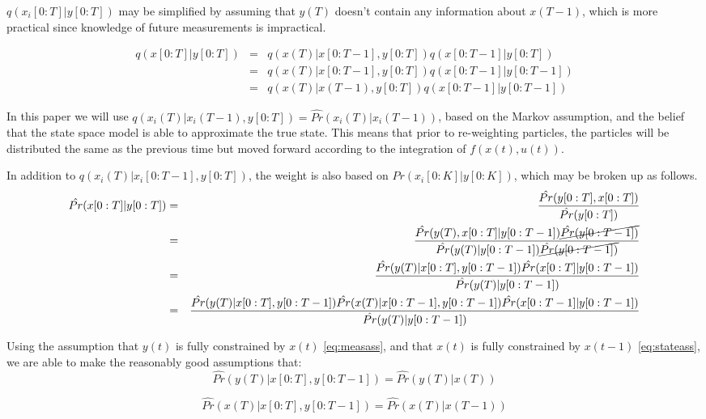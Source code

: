 $q(x_i[0:T] | y[0:T])$ may be simplified by assuming that $y(T)$ doesn't contain 
any information about $x(T-1)$, which is more practical since knowledge of future
measurements is impractical. 

\begin{eqnarray}
q(x[0:T] | y[0:T]) & = & q(x(T) | x[0:T-1], y[0:T])q(x[0:T-1] | y[0:T]) \nonumber \\
& = & q(x(T) | x[0:T-1], y[0:T])q(x[0:T-1] | y[0:T-1]) \nonumber \\
& = & q(x(T) | x(T-1), y[0:T])q(x[0:T-1] | y[0:T-1])
\end{eqnarray}

In this paper we will use 
$q(x_i(T) | x_i(T-1), y[0:T]) =  \hat{Pr}(x_i(T) | x_i(T-1))$,
based on the Markov assumption, and the belief that the state space model is 
able to approximate the true state. This means that prior to re-weighting 
particles, the particles will be distributed the same as the previous time but
moved forward according to the integration of $f(x(t), u(t))$.

In addition to $q(x_i(T) | x_i[0:T-1], y[0:T])$, the weight is also based on $Pr(x_i[0:K] | y[0:K])$,
which may be broken up as follows.
\begin{eqnarray}
\hat{Pr}(x[0:T] | y[0:T]) & = & \frac{\hat{Pr}(y[0:T], x[0:T])}{\hat{Pr}(y[0:T])} \nonumber \\
 & = & \frac{\hat{Pr}(y(T), x[0:T] | y[0:T-1]) \cancel{\hat{Pr}(y[0:T-1])}}{\hat{Pr}(y(T) | y[0:T-1]) \cancel{\hat{Pr}(y[0:T-1])}} \nonumber \\
 & = & \frac{\hat{Pr}(y(T)| x[0:T], y[0:T-1]) \hat{Pr}(x[0:T] | y[0:T-1])}{\hat{Pr}(y(T) | y[0:T-1]) } \nonumber \\
 & = & \frac{\hat{Pr}(y(T)| x[0:T], y[0:T-1]) \hat{Pr}(x(T) | x[0:T-1], y[0:T-1]) \hat{Pr}(x[0:T-1] | y[0:T-1])}{\hat{Pr}(y(T) | y[0:T-1])} \nonumber \\
\end{eqnarray}

Using the assumption that $y(t)$ is fully constrained by $x(t)$ \autoref{eq:measass},
and that $x(t)$ is fully constrained by $x(t-1)$ \autoref{eq:stateass}, we are able to
make the reasonably good assumptions that:
\begin{equation}
\hat{Pr}(y(T) | x[0:T], y[0:T-1]) = \hat{Pr}(y(T) | x(T))
\end{equation}

\begin{equation}
\hat{Pr}(x(T) | x[0:T], y[0:T-1]) = \hat{Pr}(x(T) | x(T-1))
\end{equation}

